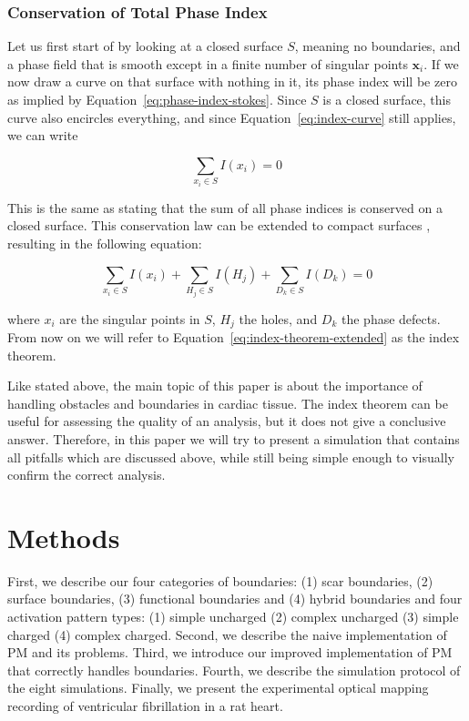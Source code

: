 \documentclass[twocolumn]{article}
\begin{document}
\subsubsection{Conservation of Total Phase Index}

Let us first start of by looking at a closed surface $S$, meaning no boundaries,
and a phase field that is smooth except in a finite number of singular points $\bm{x}_i$.
If we now draw a curve on that surface with nothing in it,
its phase index will be zero as implied by Equation~\ref{eq:phase-index-stokes}.
Since \(S\) is a closed surface, this curve also encircles everything,
and since Equation~\ref{eq:index-curve} still applies,
we can write

\begin{equation}
  \sum_{x_i \in S} I(x_i) = 0
  \label{eq:index-theorem}
\end{equation}

\noindent This is the same as stating that the sum of all phase indices is
conserved on a closed surface.
This conservation law can be extended to compact surfaces \autocite{herlin2012reconstruction, davidsen2004topological},
resulting in the following equation:

\begin{equation}
  \sum_{x_i \in S} I(x_i) + \sum_{H_j \in S} I(H_j) + \sum_{D_k \in S} I(D_k)  = 0
  \label{eq:index-theorem-extended}
\end{equation}

\noindent where \(x_i\) are the singular points in \(S\),
\(H_j\) the holes,
and \(D_k\) the phase defects.
From now on we will refer to Equation~\ref{eq:index-theorem-extended} as the index theorem.

\vspace{2em}

\noindent Like stated above, the main topic of this paper is about the importance
of handling obstacles and boundaries in cardiac tissue.
The index theorem can be useful for assessing the quality of an analysis,
but it does not give a conclusive answer.
Therefore, in this paper we will try to present a simulation
that contains all pitfalls which are discussed above,
while still being simple enough to visually confirm the correct analysis.

\section{Methods}

First, we describe our four categories of boundaries: (1) scar boundaries, (2) surface boundaries, (3) functional boundaries and (4) hybrid boundaries and four activation pattern types: (1) simple uncharged (2) complex uncharged (3) simple charged (4) complex charged.
Second, we describe the naive implementation of PM and its problems. Third, we introduce our improved implementation of PM that correctly handles boundaries. Fourth, we describe the simulation protocol of the eight simulations. Finally, we present the experimental optical mapping recording of ventricular fibrillation in a rat heart.
\end{document}
